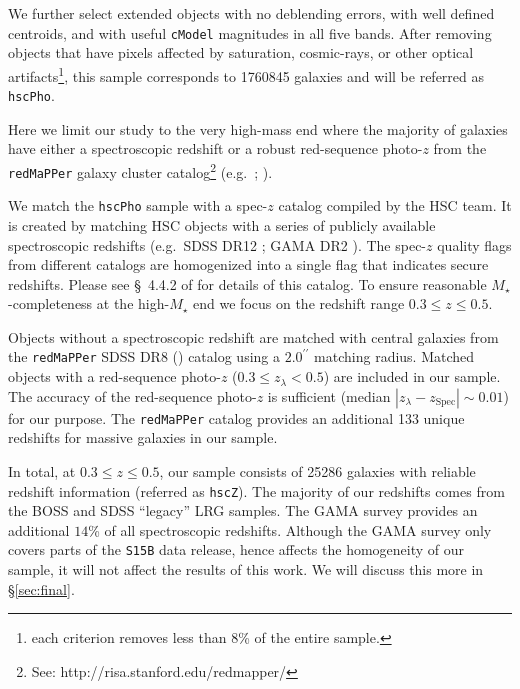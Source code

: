 \documentclass[a4paper,fleqn,usenatbib]{mnras}
\def\arcsec{{\prime\prime}}
\def\redm{\texttt{redMaPPer}}
\def\mstar{{$M_{\star}$}}
\begin{document}
    We further select extended objects with no deblending errors, with well defined 
    centroids, and with useful \texttt{cModel} magnitudes in all five bands. 
    After removing objects that have pixels affected by saturation, cosmic-rays, or 
    other optical artifacts\footnote{each criterion removes less than 8\% of the 
    entire sample.}, this sample corresponds to 1760845 galaxies and will be referred 
    as \texttt{hscPho}. 
        
    Here we limit our study to the very high-mass end where the majority of galaxies 
    have either a spectroscopic redshift or a robust red-sequence photo-$z$ from the 
    \redm{} galaxy cluster catalog\footnote{See: http://risa.stanford.edu/redmapper/} 
    (e.g.\ \citealt{Rykoff2014}; \citealt{Rozo2015b}).  

    We match the \texttt{hscPho} sample with a spec-$z$ catalog compiled by the HSC 
    team.
    It is created by matching HSC objects with a series of publicly available 
    spectroscopic redshifts (e.g.\ SDSS DR12 \citealt{SDSS-DR12}; 
    GAMA DR2 \citealt{Liske2015}). 
    The spec-$z$ quality flags from different catalogs are homogenized into a single 
    flag that indicates secure redshifts.
    Please see \S~4.4.2 of \citet{HSC-DR1} for details of this catalog.  
    To ensure reasonable \mstar{}-completeness at the high-\mstar{} end we focus on
    the redshift range $0.3 \leq z \leq 0.5$. 
   
    Objects without a spectroscopic redshift are matched with central 
    galaxies from the \redm{} SDSS DR8 (\citealt{Rykoff2014}) catalog using a 
    $2.0^{\arcsec}$ matching radius. 
    Matched objects with a red-sequence photo-$z$ ($0.3 \leq z_{\lambda} < 0.5$) are 
    included in our sample. 
    The accuracy of the red-sequence photo-$z$ is sufficient (median 
    $|z_{\lambda} - z_{\mathrm{Spec}}| {\sim} 0.01$) for our purpose.
    The \redm{} catalog provides an additional 133 unique redshifts for massive 
    galaxies in our sample.
        
    In total, at $0.3 \leq z \leq 0.5$, our sample consists of 25286 galaxies with 
    reliable redshift information (referred as \texttt{hscZ}).
    The majority of our redshifts comes from the BOSS and SDSS ``legacy'' LRG samples. 
    The GAMA survey provides an additional $14$\% of all spectroscopic redshifts.
    Although the GAMA survey only covers parts of the \texttt{S15B} data release, 
    hence affects the homogeneity of our sample, it will not affect the results of 
    this work.
    We will discuss this more in \S \ref{sec:final}.
\end{document}
